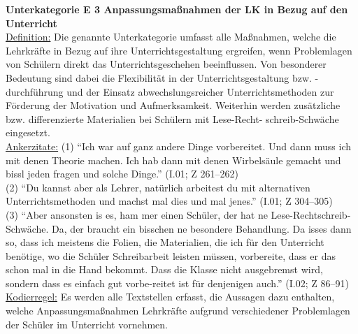 \textbf{Unterkategorie E 3 Anpassungsmaßnahmen der LK in Bezug auf den Unterricht}\\
\underline{Definition:} Die genannte Unterkategorie umfasst alle Maßnahmen, welche die Lehrkräfte in Bezug auf ihre Unterrichtsgestaltung ergreifen, wenn Problemlagen von Schülern direkt das Unterrichtsgeschehen beeinflussen. Von besonderer Bedeutung sind dabei die Flexibilität in der Unterrichtsgestaltung bzw. -durchführung und der Einsatz abwechslungsreicher Unterrichtsmethoden zur Förderung der Motivation und Aufmerksamkeit. Weiterhin werden zusätzliche bzw. differenzierte Materialien bei Schülern mit Lese-Recht- schreib-Schwäche eingesetzt.\\
\underline{Ankerzitate:} (1) "`Ich war auf ganz andere Dinge vorbereitet. Und dann muss ich mit denen Theorie machen. Ich hab dann mit denen Wirbelsäule gemacht und bissl jeden fragen und solche Dinge."' (I.01; Z 261--262)\\ (2) "`Du kannst aber als Lehrer, natürlich arbeitest du mit alternativen Unterrichtsmethoden und machst mal dies und mal jenes."' (I.01; Z 304--305)\\ (3) "`Aber ansonsten is es, ham mer einen Schüler, der hat ne Lese-Rechtschreib-Schwäche. Da, der braucht ein bisschen ne besondere Behandlung. Da isses dann so, dass ich meistens die Folien, die Materialien, die ich für den Unterricht benötige, wo die Schüler Schreibarbeit leisten müssen, vorbereite, dass er das schon mal in die Hand bekommt. Dass die Klasse nicht ausgebremst wird, sondern dass es einfach gut vorbe-reitet ist für denjenigen auch."' (I.02; Z 86--91)\\
\underline{Kodierregel:} Es werden alle Textstellen erfasst, die Aussagen dazu enthalten, welche Anpassungsmaßnahmen Lehrkräfte aufgrund verschiedener Problemlagen der Schüler im Unterricht vornehmen.\\

